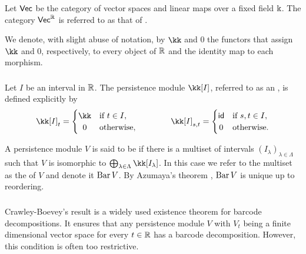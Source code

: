 \subsubsection{}

Let $\Vec$ be the category of vector spaces and linear maps over a fixed field $\k$.
The category $\Vec^\R$ is referred to as that of .

We denote, with slight abuse of notation, by $\kk$ and $0$ the functors that assign $\kk$ and $0$, respectively, to every object of $\R$ and the identity map to each morphism.

\subsubsection{}

Let $I$ be an interval in $\R$.
The persistence module $\kk[I]$, referred to as an , is defined explicitly by
\[
\kk[I]_t =
\begin{cases}
	\kk & \text{if } t \in I, \\
	\hfil 0 & \text{otherwise},
\end{cases}
\qquad \qquad
\kk[I]_{s, t} =
\begin{cases}
	\id & \text{if } s, t \in I, \\
	\hfil 0 & \text{otherwise}.
\end{cases}
\]

A persistence module $V$ is said to be  if there is a multiset of intervals $(I_\lambda)_{\lambda \in \Lambda}$ such that $V$ is isomorphic to $\bigoplus_{\lambda \in \Lambda} \kk[I_\lambda]$.
In this case we refer to the multiset as the  of $V$ and denote it $\barc V$.
By Azumaya’s theorem \cite{azumaya1950theorem}, $\barc V$ is unique up to reordering.

\subsubsection{}

Crawley-Boevey's result \cite{Crawley-Boevey.2015} is a widely used existence theorem for barcode decompositions.
It ensures that any persistence module \(V\) with \(V_t\) being a finite dimensional vector space for every \(t \in \R\) has a barcode decomposition.
However, this condition is often too restrictive.

